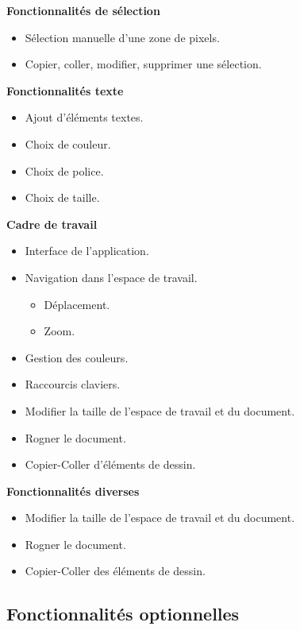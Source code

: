 \documentclass[11pt, a4paper, french]{article}
\begin{document}
			\textbf{Fonctionnalités de sélection}
			\begin{itemize}[label=\textbullet]
				\item Sélection manuelle d’une zone de pixels.
				\item Copier, coller, modifier, supprimer une sélection. \\
			\end{itemize}

			\textbf{Fonctionnalités texte}
			\begin{itemize}[label=\textbullet]
				\item Ajout d’éléments textes.
				\item Choix de couleur.
				\item Choix de police.
				\item Choix de taille. \\
			\end{itemize}

			\textbf{Cadre de travail}
			\begin{itemize}[label=\textbullet]
				\item Interface de l’application.
				\item Navigation dans l’espace de travail.
				\begin{itemize}[label=\textbullet]
					\item Déplacement.
					\item Zoom.
				\end{itemize}
				\item Gestion des couleurs.
				\item Raccourcis claviers.
				\item Modifier la taille de l’espace de travail et du document.
				\item Rogner le document.
				\item Copier-Coller d’éléments de dessin. \\
			\end{itemize}

			\textbf{Fonctionnalités diverses}
			\begin{itemize}[label=\textbullet]
				\item Modifier la taille de l’espace de travail et du document.
				\item Rogner le document.
				\item Copier-Coller des éléments de dessin. \\
			\end{itemize}


		\subsection {Fonctionnalités optionnelles}
\end{document}
